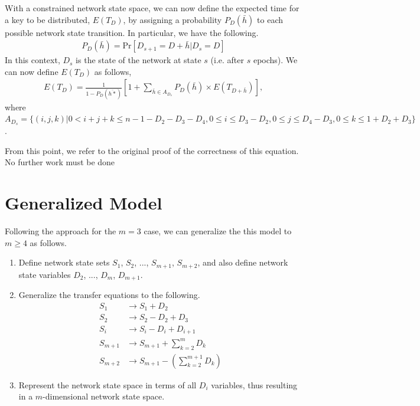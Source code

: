 \documentclass[a4paper,10pt]{article}
\begin{document}
With a constrained network state space, we can now define the expected time for a key to be distributed, $E(T_D)$, 
by assigning a probability $P_D(\bar{h})$ to each possible network state transition. In particular, we have the following.
\begin{align*}
P_D(\bar{h}) = \text{Pr}[D_{s+1} = D + \bar{h} | D_s = D]
\end{align*}
In this context, $D_s$ is the state of the network at state $s$ (i.e. after $s$ epochs). We can now define $E(T_D)$ as 
follows,
\begin{align*}
E(T_D) = \frac{1}{1 - P_D(\bar{h*})}[1 + \sum_{\bar{h} \in A_{D_s}} P_D(\bar{h}) \times E(T_{D + \bar{h}})],
\end{align*}
where $A_{D_s} = \{ (i, j, k) | 0 < i + j + k \leq n - 1 - D_2 - D_3 - D_4, 0 \leq i \leq D_3 - D_2, 0 \leq j \leq D_4 - D_3, 0 \leq k \leq 1 + D_2 + D_3\}$.

From this point, we refer to the original proof of the correctness of this equation. No further work must be done

\section{Generalized Model}
Following the approach for the $m = 3$ case, we can generalize the this model to $m \geq 4$ as follows.
\begin{enumerate}
	\item Define network state sets $S_1$, $S_2$, ..., $S_{m+1}$, $S_{m+2}$, and also define network state variables $D_2$, ..., $D_m$, $D_{m+1}$.
	\item Generalize the transfer equations to the following.
	\begin{align*}
		S_1 & \rightarrow S_1 + D_2 \\
		S_2 & \rightarrow S_2 - D_2 + D_3 \\
		S_i & \rightarrow S_i - D_i + D_{i+1} \\
		S_{m+1} & \rightarrow S_{m+1} + \sum_{k=2}^{m}D_k \\
		S_{m+2} & \rightarrow S_{m+1} - (\sum_{k=2}^{m+1}D_k) 
	\end{align*}
	\item Represent the network state space in terms of all $D_i$ variables, thus resulting in a $m$-dimensional network 
	state space. 
\end{enumerate}

\end{document}
